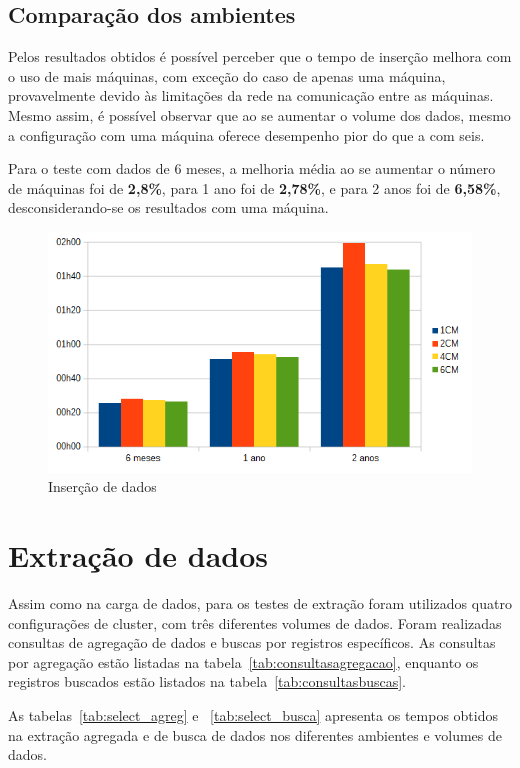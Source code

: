 \subsection{Comparação dos ambientes}

Pelos resultados obtidos é possível perceber que o tempo de inserção melhora com o uso de mais máquinas, com exceção do caso de apenas uma máquina, provavelmente devido às limitações da rede na comunicação entre as máquinas. Mesmo assim, é possível observar que ao se aumentar o volume dos dados, mesmo a configuração com uma máquina oferece desempenho pior do que a com seis. 

Para o teste com dados de 6 meses, a melhoria média ao se aumentar o número de máquinas foi de \textbf{2,8\%}, para 1 ano foi de \textbf{2,78\%}, e para 2 anos foi de \textbf{6,58\%}, desconsiderando-se os resultados com uma máquina.

\begin{figure}[!htb]
	\centering
	\includegraphics[width=1\textwidth]{figuras/graphinsert.png}
	\caption{Inserção de dados}
	\label{fig:graphinsert}
\end{figure}

\section{Extração de dados}
Assim como na carga de dados, para os testes de extração foram utilizados quatro configurações de cluster, com três diferentes volumes de dados. Foram realizadas consultas de agregação de dados e buscas por registros específicos.
As consultas por agregação estão listadas na tabela~\ref{tab:consultasagregacao}, enquanto os registros buscados estão listados na tabela~\ref{tab:consultasbuscas}.

As tabelas~\ref{tab:select_agreg} e ~\ref{tab:select_busca} apresenta os tempos obtidos na extração agregada e de busca de dados nos diferentes ambientes e volumes de dados.


